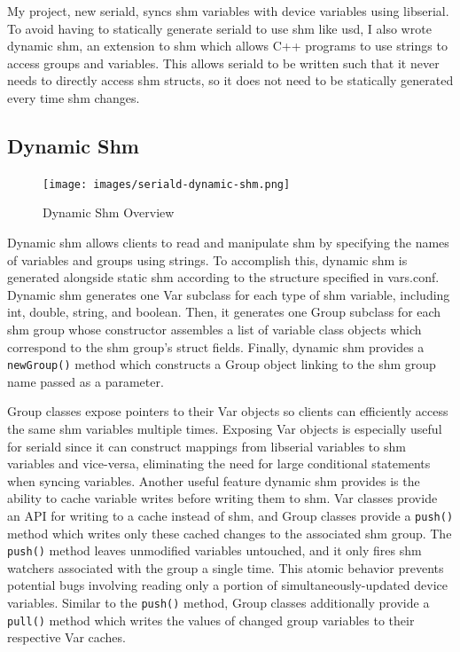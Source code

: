 \documentclass[11pt]{article}
\begin{document}
My project, new seriald, syncs shm variables with device variables using libserial. To avoid having to statically generate seriald to use shm like usd, I also wrote dynamic shm, an extension to shm which allows C++ programs to use strings to access groups and variables. This allows seriald to be written such that it never needs to directly access shm structs, so it does not need to be statically generated every time shm changes.

\subsection{Dynamic Shm}
\begin{figure}
    \centering
    \texttt{[image: images/seriald-dynamic-shm.png]}
    \caption{Dynamic Shm Overview}
    \label{fig:dynshm}
\end{figure}

Dynamic shm allows clients to read and manipulate shm by specifying the names of variables and groups using strings. To accomplish this, dynamic shm is generated alongside static shm according to the structure specified in vars.conf. Dynamic shm generates one Var subclass for each type of shm variable, including int, double, string, and boolean. Then, it generates one Group subclass for each shm group whose constructor assembles a list of variable class objects which correspond to the shm group's struct fields. Finally, dynamic shm provides a \texttt{newGroup()} method which constructs a Group object linking to the shm group name passed as a parameter.

Group classes expose pointers to their Var objects so clients can efficiently access the same shm variables multiple times. Exposing Var objects is especially useful for seriald since it can construct mappings from libserial variables to shm variables and vice-versa, eliminating the need for large conditional statements when syncing variables. Another useful feature dynamic shm provides is the ability to cache variable writes before writing them to shm. Var classes provide an API for writing to a cache instead of shm, and Group classes provide a \texttt{push()} method which writes only these cached changes to the associated shm group. The \texttt{push()} method leaves unmodified variables untouched, and it only fires shm watchers associated with the group a single time. This atomic behavior prevents potential bugs involving reading only a portion of simultaneously-updated device variables. Similar to the \texttt{push()} method, Group classes additionally provide a \texttt{pull()} method which writes the values of changed group variables to their respective Var caches.
\end{document}
